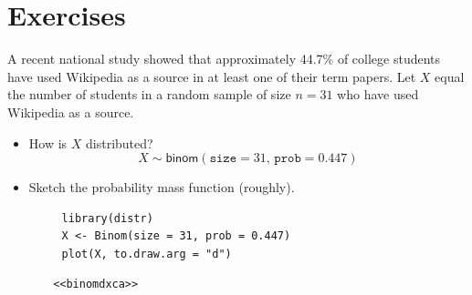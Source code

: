 \documentclass[captions=tableheading]{scrbook}
\begin{document}
\section{Exercises}
\label{sec-5-8}

\setcounter{thm}{0}

\begin{xca}
A recent national study showed that approximately 44.7\% of college students have used Wikipedia as a source in at least one of their term papers. Let \(X\) equal the number of students in a random sample of size \(n=31\) who have used Wikipedia as a source. 
\begin{itemize}
\item How is \(X\) distributed? 
     \[
     X\sim\mathsf{binom}(\mathtt{size}=31,\,\mathtt{prob}=0.447)
     \]
\item Sketch the probability mass function (roughly).

\begin{verbatim}
     library(distr)
     X <- Binom(size = 31, prob = 0.447)
     plot(X, to.draw.arg = "d")
\end{verbatim}
\end{itemize}

\begin{verbatim}
       <<binomdxca>>
\end{verbatim}


\end{xca}
\end{document}
